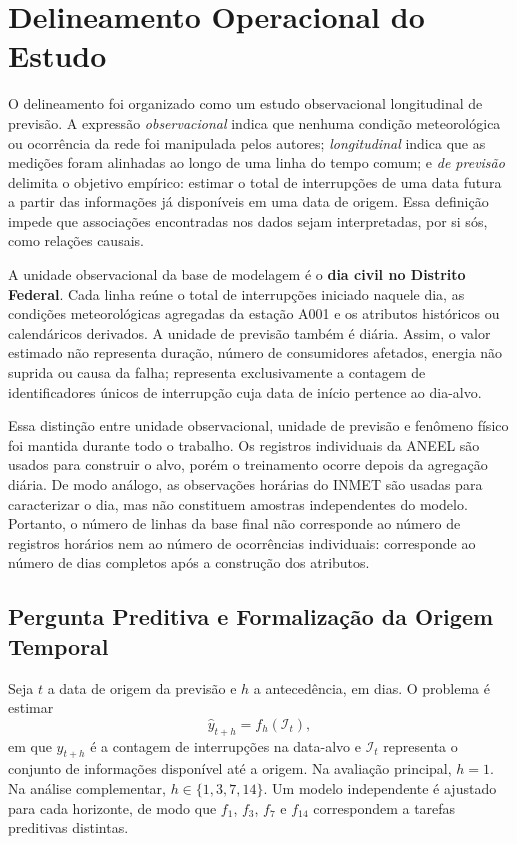 \section{Delineamento Operacional do Estudo}\label{sec:delineamento_operacional}

O delineamento foi organizado como um estudo observacional longitudinal de previsão. A expressão \textit{observacional} indica que nenhuma condição meteorológica ou ocorrência da rede foi manipulada pelos autores; \textit{longitudinal} indica que as medições foram alinhadas ao longo de uma linha do tempo comum; e \textit{de previsão} delimita o objetivo empírico: estimar o total de interrupções de uma data futura a partir das informações já disponíveis em uma data de origem. Essa definição impede que associações encontradas nos dados sejam interpretadas, por si sós, como relações causais.

A unidade observacional da base de modelagem é o \textbf{dia civil no Distrito Federal}. Cada linha reúne o total de interrupções iniciado naquele dia, as condições meteorológicas agregadas da estação A001 e os atributos históricos ou calendáricos derivados. A unidade de previsão também é diária. Assim, o valor estimado não representa duração, número de consumidores afetados, energia não suprida ou causa da falha; representa exclusivamente a contagem de identificadores únicos de interrupção cuja data de início pertence ao dia-alvo.

Essa distinção entre unidade observacional, unidade de previsão e fenômeno físico foi mantida durante todo o trabalho. Os registros individuais da ANEEL são usados para construir o alvo, porém o treinamento ocorre depois da agregação diária. De modo análogo, as observações horárias do INMET são usadas para caracterizar o dia, mas não constituem amostras independentes do modelo. Portanto, o número de linhas da base final não corresponde ao número de registros horários nem ao número de ocorrências individuais: corresponde ao número de dias completos após a construção dos atributos.

\subsection{Pergunta Preditiva e Formalização da Origem Temporal}

Seja $t$ a data de origem da previsão e $h$ a antecedência, em dias. O problema é estimar
\begin{equation}
    \widehat{y}_{t+h}=f_h(\mathcal{I}_t),
\end{equation}
em que $y_{t+h}$ é a contagem de interrupções na data-alvo e $\mathcal{I}_t$ representa o conjunto de informações disponível até a origem. Na avaliação principal, $h=1$. Na análise complementar, $h\in\{1,3,7,14\}$. Um modelo independente é ajustado para cada horizonte, de modo que $f_1$, $f_3$, $f_7$ e $f_{14}$ correspondem a tarefas preditivas distintas.

